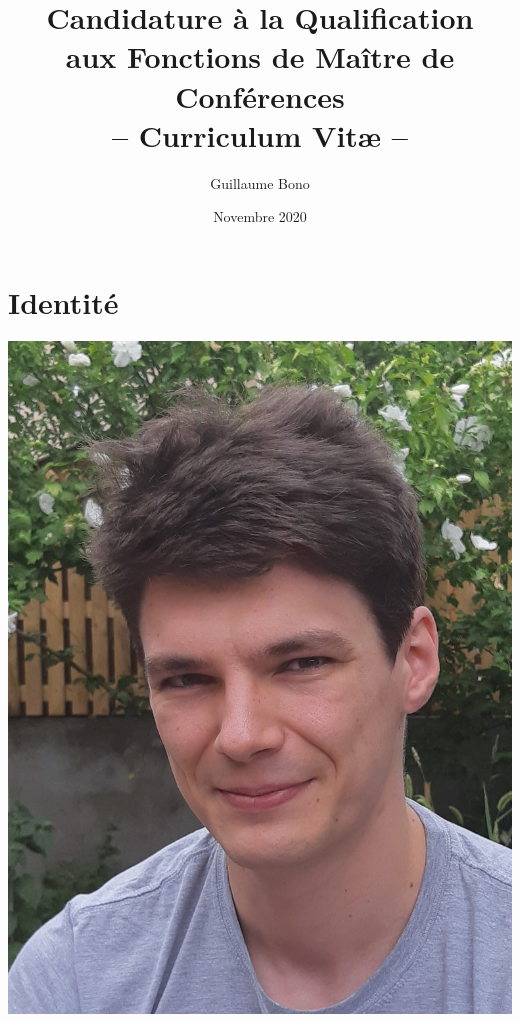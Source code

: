 \documentclass[a4paper, 11pt]{article}
\begin{document}
    \title{Candidature {\`a} la Qualification \\
           aux Fonctions de Ma{\^i}tre de Conf{\'e}rences \\
           -- Curriculum Vit{\ae} --}
    \author{Guillaume Bono}
    \date{Novembre 2020}

    \maketitle
    
    \section*{Identit{\'e}}

    \noindent
    \begin{minipage}{.09\textwidth}
        \includegraphics[width=\textwidth]{./photo_gbo_bio.jpg}
    \end{minipage}
\end{document}

